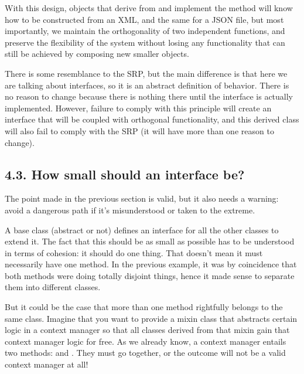 \documentclass[a4paper,10pt,english]{sphinxmanual}
\begin{document}
\begin{figure}[H]
\centering

\noindent{}
\end{figure}

With this design, objects that derive from  and implement the
 method will know how to be constructed from an XML, and the same for a
JSON file, but most importantly, we maintain the orthogonality of two independent
functions, and preserve the flexibility of the system without losing any functionality that
can still be achieved by composing new smaller objects.

There is some resemblance to the SRP, but the main difference is that here we are talking
about interfaces, so it is an abstract definition of behavior. There is no reason to change
because there is nothing there until the interface is actually implemented. However, failure
to comply with this principle will create an interface that will be coupled with orthogonal
functionality, and this derived class will also fail to comply with the SRP (it will have more
than one reason to change).


\subsection{4.3. How small should an interface be?}
\label{\detokenize{chapters/4_solid_principles/index:how-small-should-an-interface-be}}
The point made in the previous section is valid, but it also needs a warning: avoid a
dangerous path if it’s misunderstood or taken to the extreme.

A base class (abstract or not) defines an interface for all the other classes to extend it. The
fact that this should be as small as possible has to be understood in terms of cohesion: it
should do one thing. That doesn’t mean it must necessarily have one method. In the
previous example, it was by coincidence that both methods were doing totally disjoint
things, hence it made sense to separate them into different classes.

But it could be the case that more than one method rightfully belongs to the same class.
Imagine that you want to provide a mixin class that abstracts certain logic in a context
manager so that all classes derived from that mixin gain that context manager logic for free.
As we already know, a context manager entails two methods:  and .
They must go together, or the outcome will not be a valid context manager at all!
\end{document}
